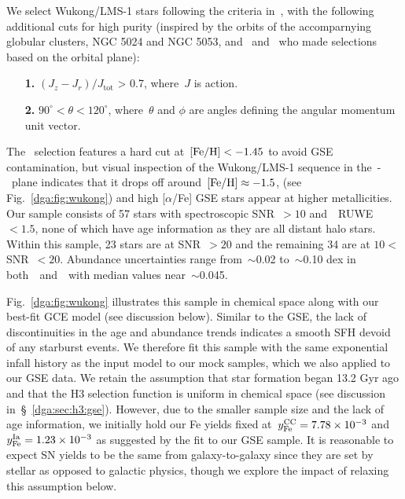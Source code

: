 We select Wukong/LMS-1 stars following the criteria in~\citet{Naidu2020}, with
the following additional cuts for high purity (inspired by the orbits of the
accomparnying globular clusters, NGC 5024 and NGC 5053, and~\citealt{Yuan2020}
and~\citealt{Malhan2021} who made selections based on the orbital plane):
\begin{itemize}

	\item[\textbf{1.}] $(J_z - J_r) / J_\text{tot}$ > 0.7, where~$J$ is action.

	\item[\textbf{2.}] $90^\circ < \theta < 120^\circ$, where~$\theta$ and
	$\phi$ are angles defining the angular momentum unit vector.

\end{itemize}
The~\citet{Naidu2020} selection features a hard cut at~$\text{[Fe/H]} < -1.45$ to avoid
GSE contamination, but visual inspection of the Wukong/LMS-1 sequence in
the~\afe-\feh~plane indicates that it drops off around~$\text{[Fe/H]} \approx -1.5$,
(see Fig.~\ref{dga:fig:wukong}) and high [$\alpha$/Fe] GSE stars appear at higher
metallicities.
Our sample consists of 57 stars with spectroscopic SNR~$> 10$
and~\gaia~RUWE~$< 1.5$, none of which have age information as they are all
distant halo stars.
Within this sample, 23 stars are at SNR~$> 20$ and the remaining 34 are at
$10 <$ SNR~$< 20$.
Abundance uncertainties range from~$\sim$0.02 to~$\sim$0.10 dex in
both~\afe~and~\feh~with median values near~$\sim$0.045.
\par
Fig.~\ref{dga:fig:wukong} illustrates this sample in chemical space along with our
best-fit GCE model (see discussion below).
Similar to the GSE, the lack of discontinuities in the age and abundance trends
indicates a smooth SFH devoid of any starburst events.
We therefore fit this sample with the same exponential infall history as the
input model to our mock samples, which we also applied to our GSE data.
We retain the assumption that star formation began 13.2 Gyr ago and that the H3
selection function is uniform in chemical space (see discussion
in~\S~\ref{dga:sec:h3:gse}).
However, due to the smaller sample size and the lack of age information, we
initially hold our Fe yields fixed at~$y_\text{Fe}^\text{CC} = 7.78\times10^{-3}$ and
$y_\text{Fe}^\text{Ia} = 1.23\times10^{-3}$ as suggested by the fit to our GSE sample.
It is reasonable to expect SN yields to be the same from galaxy-to-galaxy since
they are set by stellar as opposed to galactic physics, though we explore the
impact of relaxing this assumption below.
\par
